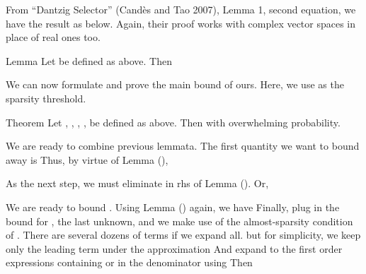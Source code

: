 From ``Dantzig Selector'' (Cand\`es and Tao 2007), Lemma 1, second equation, we have the result as below.
Again, their proof works with complex vector spaces in place of real ones too.

\Result
{Lemma}
{
Let  be defined as above.
Then
}

\startsection [title={The Main Bound}]

We can now formulate and prove the main bound of ours.
Here, we use  as the sparsity threshold.

\Result
{Theorem}
{
Let , , , ,  be defined as above.
Then
with overwhelming probability.
}

We are ready to combine previous lemmata.
The first quantity we want to bound away is
Thus, by virtue of Lemma (),

As the next step, we must eliminate  in rhs of Lemma ().
Or,

We are ready to bound .
Using Lemma () again, we have
Finally, plug in the bound for , the last unknown, and we make use of the almost-sparsity condition of .
There are several dozens of terms if we expand all.
but for simplicity, we keep only the leading term under the approximation
And expand to the first order expressions containing  or  in the denominator using
Then

\color[red]{(To be done)}

\stopchapter
